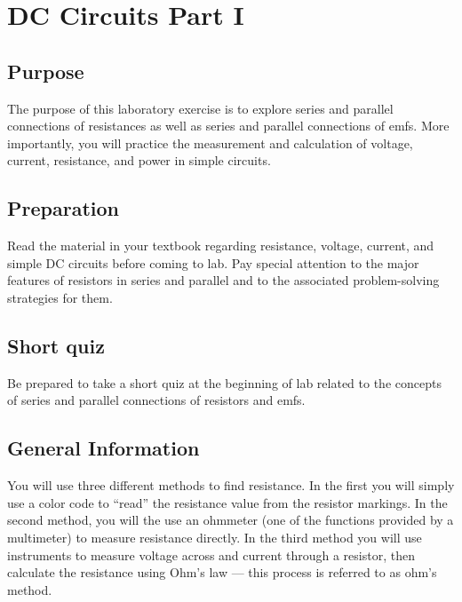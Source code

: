 \chapter {DC Circuits Part I}

\begin{multicols}{2}
\section{Purpose}  
The purpose of this laboratory exercise is to explore series and parallel connections of resistances as well as series and parallel connections of emfs.  More importantly, you will practice the measurement and calculation of voltage, current, resistance, and power in simple circuits.

\section{Preparation}  
Read the material in your textbook regarding resistance, voltage, current, and simple DC circuits before coming to lab. Pay special attention to the major features of resistors in series and parallel and to the associated problem-solving strategies for them.

\section {Short quiz}  Be prepared to take a short quiz at the beginning of lab related to the concepts of series and parallel connections of resistors and emfs.

\section{General Information}
You will use three different methods to find resistance.  In the first you will simply use a color code to ``read'' the resistance value from the resistor markings. In the second method, you will the use an ohmmeter (one of the functions provided by a multimeter) to measure resistance directly.  In the third method you will use instruments to measure voltage across and current through a resistor, then calculate the resistance using Ohm's law --- this process is  referred to as ohm's method.


\end{multicols}
